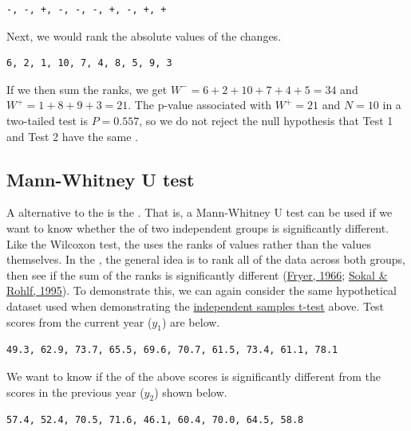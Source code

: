 \documentclass[
  openany]{krantz}
\begin{document}
\begin{verbatim}
-, -, +, -, -, -, +, -, +, +
\end{verbatim}

Next, we would rank the absolute values of the changes.

\begin{verbatim}
6, 2, 1, 10, 7, 4, 8, 5, 9, 3
\end{verbatim}

If we then sum the ranks, we get \(W^{-} = 6 + 2 + 10 + 7 + 4 + 5 = 34\) and \(W^{+} = 1 + 8 + 9 + 3 = 21\).
The p-value associated with \(W^{+} = 21\) and \(N = 10\) in a two-tailed test is \(P = 0.557\), so we do not reject the null hypothesis that Test 1 and Test 2 have the same .

\hypertarget{mann-whitney-u-test}{%
\subsection{Mann-Whitney U test}\label{mann-whitney-u-test}}

A  alternative to the  is the .
That is, a Mann-Whitney U test can be used if we want to know whether the  of two independent groups is significantly different.
Like the Wilcoxon test, the  uses the ranks of values rather than the values themselves.
In the , the general idea is to rank all of the data across both groups, then see if the sum of the ranks is significantly different (\protect\hyperlink{ref-Fryer1966}{Fryer, 1966}; \protect\hyperlink{ref-Sokal1995}{Sokal \& Rohlf, 1995}).
To demonstrate this, we can again consider the same hypothetical dataset used when demonstrating the \protect\hyperlink{independent-samples-t-test}{independent samples t-test} above.
Test scores from the current year (\(y_{1}\)) are below.

\begin{verbatim}
49.3, 62.9, 73.7, 65.5, 69.6, 70.7, 61.5, 73.4, 61.1, 78.1
\end{verbatim}

We want to know if the  of the above scores is significantly different from the  scores in the previous year (\(y_{2}\)) shown below.

\begin{verbatim}
57.4, 52.4, 70.5, 71.6, 46.1, 60.4, 70.0, 64.5, 58.8
\end{verbatim}
\end{document}
